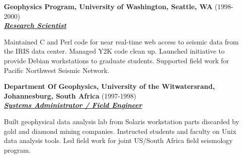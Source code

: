 \documentclass{article}
\newcommand{\employer}[3]{{ \textbf{#1} (#2)\\ \underline{\textbf{\emph{#3}}}\\ \nopagebreak }}
\newenvironment{achievements}{\begin{list}{\topsep 0pt \itemsep -2pt}} {\vspace*{4pt}\end{list}}
\begin{document}
\employer{Geophysics Program, University of Washington, Seattle, WA}{1998-2000}{Research Scientist}
\begin{achievements}
    \item Maintained C and Perl code for near real-time web access to seismic data from the IRIS data center.  Managed Y2K code clean up.  Launched initiative to provide Debian workstations to graduate students.  Supported field work for Pacific Northwest Seismic Network.
\end{achievements}

\employer{Department Of Geophysics, University of the Witwatersrand,
Johannesburg, South Africa}{1997-1998}{Systems Administrator / Field Engineer}
\begin{achievements}
    \item Built geophysical data analysis lab from Solaris workstation parts discarded by gold and diamond mining companies.  Instructed students and faculty on Unix data analysis tools.  Led field work for joint US/South Africa field seismology program.
\end{achievements}
\end{document}
